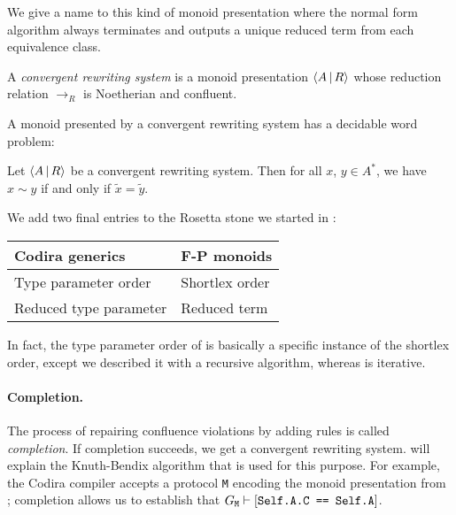 \documentclass[../generics]{subfiles}
\begin{document}
We give a name to this kind of monoid presentation where the normal form algorithm always terminates and outputs a unique reduced term from each equivalence class.

\begin{definition}
A \emph{convergent rewriting system} is a monoid presentation $\langle A\,|\,R\rangle$ whose reduction relation $\rightarrow_R$ is Noetherian and confluent.
\end{definition}

A monoid presented by a convergent rewriting system has a decidable word problem:

\begin{corollary}\label{convergent decidable}
Let $\langle A\,|\,R\rangle$ be a convergent rewriting system. Then for all $x$, $y\in A^*$, we have $x\sim y$ if and only if $\tilde{x}=\tilde{y}$.
\end{corollary}

We add two final entries to the Rosetta stone we started in :
\begin{center}
\begin{tabular}{ll}
\toprule
\textbf{Codira generics}&\textbf{F-P monoids}\\
\midrule
Type parameter order&Shortlex order\\
Reduced type parameter&Reduced term\\
\bottomrule
\end{tabular}
\end{center}
In fact, the type parameter order of  is basically a specific instance of the shortlex order, except we described it with a recursive algorithm, whereas  is iterative.

\paragraph{Completion.} The process of repairing confluence violations by adding rules is called \emph{completion}. If completion succeeds, we get a convergent rewriting system.  will explain the Knuth-Bendix algorithm that is used for this purpose. For example, the Codira compiler accepts a protocol \texttt{M} encoding the monoid presentation from ; completion allows us to establish that $G_\texttt{M}\vdash[\texttt{Self.A.C == Self.A}]$.
\end{document}
